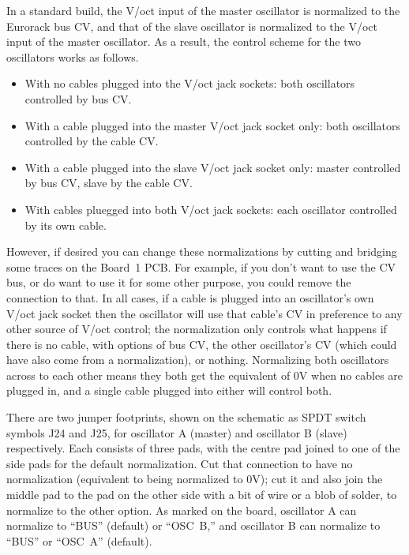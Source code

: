 In a standard build, the V/oct input of the master oscillator is normalized
to the Eurorack bus CV, and that of the slave oscillator is normalized to
the V/oct input of the master oscillator.  As a result, the control scheme
for the two oscillators works as follows.
\begin{itemize}
  \item With no cables plugged into the V/oct jack sockets:  both
    oscillators controlled by bus CV.
  \item With a cable plugged into the master V/oct jack socket only:  both
    oscillators controlled by the cable CV.
  \item With a cable plugged into the slave V/oct jack socket only:  master
    controlled by bus CV, slave by the cable CV.
  \item With cables pluegged into both V/oct jack sockets:  each oscillator
    controlled by its own cable.
\end{itemize}

However, if desired you can change these normalizations by cutting and
bridging some traces on the Board~1 PCB.  For example, if you don't want to
use the CV bus, or do want to use it for some other purpose, you could
remove the connection to that.  In all cases, if a cable is plugged into an
oscillator's own V/oct jack socket then the oscillator will use that cable's
CV in preference to any other source of V/oct control; the normalization
only controls what happens if there is no cable, with options of bus CV, the
other oscillator's CV (which could have also come from a normalization), or
nothing.  Normalizing both oscillators across to each other means they both
get the equivalent of 0V when no cables are plugged in, and a single cable
plugged into either will control both.

There are two jumper footprints, shown on the schematic as SPDT switch
symbols J24 and J25, for oscillator A (master) and oscillator B (slave)
respectively.  Each consists of three pads, with the centre pad joined to
one of the side pads for the default normalization.  Cut that connection to
have no normalization (equivalent to being normalized to 0V); cut it and
also join the middle pad to the pad on the other side with a bit of wire or
a blob of solder, to normalize to the other option.  As marked on the board,
oscillator A can normalize to ``BUS'' (default) or ``OSC~B,'' and oscillator
B can normalize to ``BUS'' or ``OSC~A'' (default).

